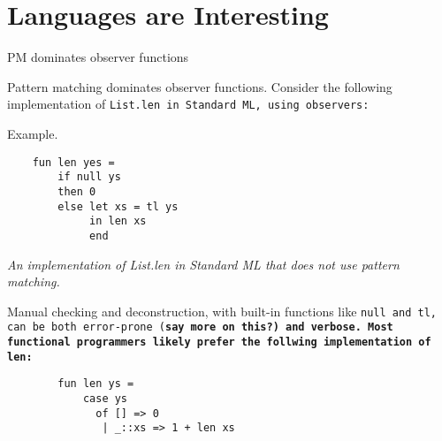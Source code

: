 \documentclass[manuscript,screen,review, 12pt]{acmart}
\begin{document}
\section{Languages are Interesting}
    \begin{outline}[enumerate]
    \1 PM dominates observer functions 

    Pattern matching dominates observer functions. Consider the following
    implementation of \tt{List.len} in Standard ML, using observers:
    
    
    
    
    
    
    
    
    
    \2 Example. 
    \smllst
    
    \begin{lstlisting}
    fun len yes =
        if null ys 
        then 0 
        else let xs = tl ys 
             in len xs 
             end 
    \end{lstlisting}
    \it{An implementation of List.len in Standard ML that does not use pattern 
        matching.}
    
    Manual checking and deconstruction, with built-in functions like \tt{null} and
    \tt{tl}, can be both error-prone (\bf{say more on this?}) and verbose. Most
    functional programmers likely prefer the follwing implementation of \tt{len}:
    
    \begin{lstlisting}
        fun len ys =
            case ys 
              of [] => 0
               | _::xs => 1 + len xs
        \end{lstlisting}
    

\end{outline}
\end{document}

